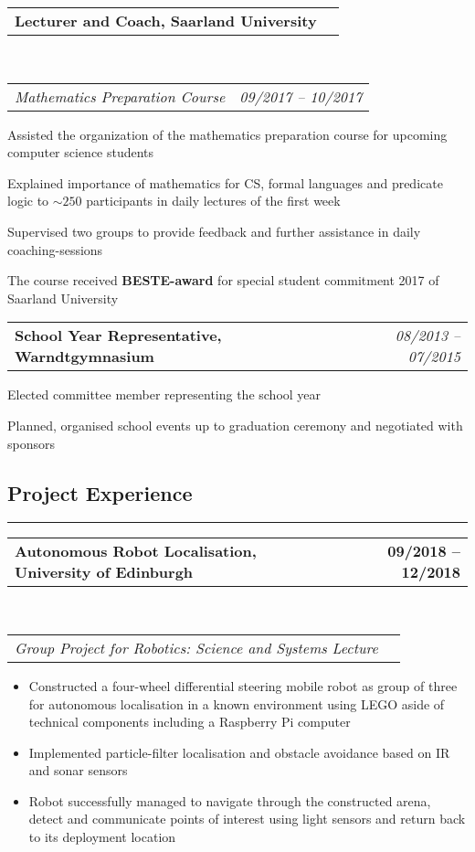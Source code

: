 \documentclass[10pt,letterpaper]{article}
\makeatletter
\newcommand{\headerrow}[2]
{\begin{tabular*}{\linewidth}{l@{\extracolsep{\fill}}r}
	#1 &
	#2 \\
\end{tabular*}}
\makeatother
\begin{document}
\noindent
\headerrow{\textbf{Lecturer and Coach, Saarland University}}{}
\\
\headerrow{\emph{Mathematics Preparation Course}}{\emph{09/2017 -- 10/2017}}
\vspace{-1.6em}
\begin{itemize*}
    \item Assisted the organization of the mathematics preparation course for upcoming computer science students%
    \item Explained importance of mathematics for CS, formal languages and predicate logic to $\sim250$ participants in daily lectures of the first week
    \item Supervised two groups to provide feedback and further assistance in daily coaching-sessions
    \item The course received \textbf{BESTE-award} for special student commitment 2017 of Saarland University
\end{itemize*}

\vspace{0.4em}

\noindent
\headerrow{\textbf{School Year Representative, Warndtgymnasium}}{\emph{08/2013 -- 07/2015}}
\vspace{-1.6em}
\begin{itemize*}
    \item Elected committee member representing the school year
    \item Planned, organised school events up to graduation ceremony and negotiated with sponsors
\end{itemize*}


\subsection*{Project Experience}
\hrule
\vspace{0.4em}

\noindent
\headerrow{\textbf{Autonomous Robot Localisation, University of Edinburgh}}{\textbf{09/2018 -- 12/2018}}
\\
\headerrow{\emph{Group Project for Robotics: Science and Systems Lecture}}{}
\vspace{-1.6em}
\begin{itemize}
    \setlength\itemsep{0em}
    \item Constructed a four-wheel differential steering mobile robot as group of three for autonomous localisation in a 
    known environment using LEGO aside of technical components including a Raspberry Pi computer
    \item Implemented particle-filter localisation and obstacle avoidance based on IR and sonar sensors
    \item Robot successfully managed to navigate through the constructed arena, detect and communicate points of
    interest using light sensors and return back to its deployment location
\end{itemize}
\end{document}
